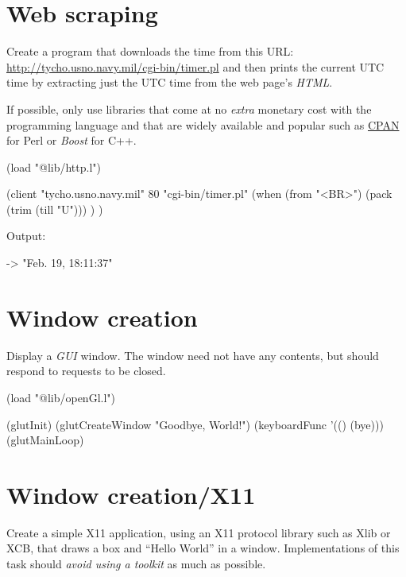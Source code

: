 \pagebreak{}
\section*{Web scraping}

Create a program that downloads the time from this URL:
\href{http://tycho.usno.navy.mil/cgi-bin/timer.pl}{http://tycho.usno.navy.mil/cgi-bin/timer.pl}
and then prints the current UTC time by extracting just the UTC time
from the web page's \emph{HTML}.

If possible, only use libraries that come at no \emph{extra} monetary
cost with the programming language and that are widely available and
popular such as \href{http://www.cpan.org/}{CPAN} for Perl or
\emph{Boost} for C++.

\begin{wideverbatim}

(load "@lib/http.l")

(client "tycho.usno.navy.mil" 80 "cgi-bin/timer.pl"
   (when (from "<BR>")
      (pack (trim (till "U"))) ) )

Output:

-> "Feb. 19, 18:11:37"

\end{wideverbatim}

\pagebreak{}
\section*{Window creation}

Display a \emph{GUI} window. The window need not have any
contents, but should respond to requests to be closed.

\begin{wideverbatim}

(load "@lib/openGl.l")

(glutInit)
(glutCreateWindow "Goodbye, World!")
(keyboardFunc '(() (bye)))
(glutMainLoop)

\end{wideverbatim}

\pagebreak{}
\section*{Window creation/X11}

Create a simple X11 application, using an X11 protocol library such as
Xlib or XCB, that draws a box and ``Hello World'' in a window.
Implementations of this task should \emph{avoid using a toolkit} as much
as possible.

